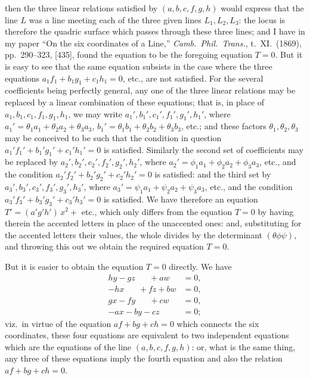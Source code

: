 \documentclass[11pt,a4paper]{article}
\begin{document}
\newpage


\noindent then the three linear relations satisfied by $(a, b, c, f, g, h)$ would express that the line $L$ was a line meeting each of the three given lines $L_{1}, L_{2}, L_{3}$: the locus is therefore the quadric surface which passes through these three lines; and I have in my paper ``On the six coordinates of a Line,'' \emph{Camb.\ Phil.\ Trans.}, t.~XI.\ (1869), pp.~290--323, [435], found the equation to be the foregoing equation $T = 0$. But it is easy to see that the same equation subsists in the case where the three equations $a_{1}f_{1} + b_{1}g_{1} + c_{1}h_{1} = 0$, etc., are not satisfied. For the several coefficients being perfectly general, any one of the three linear relations may be replaced by a linear combination of these equations; that is, in place of $a_{1}, b_{1}, c_{1}, f_{1}, g_{1}, h_{1}$, we may write $a_{1}', b_{1}', c_{1}', f_{1}', g_{1}', h_{1}'$, where $a_{1}' = \theta_{1}a_{1} + \theta_{2}a_{2} + \theta_{3}a_{3}$, $b_{1}' = \theta_{1}b_{1} + \theta_{2}b_{2} + \theta_{3}b_{3}$, etc.; and these factors $\theta_{1}, \theta_{2}, \theta_{3}$ may be conceived to be such that the condition in question $a_{1}'f_{1}' + b_{1}'g_{1}' + c_{1}'h_{1}' = 0$ is satisfied. Similarly the second set of coefficients may be replaced by $a_{2}', b_{2}', c_{2}', f_{2}', g_{2}', h_{2}'$, where $a_{2}' = \phi_{1}a_{1} + \phi_{2}a_{2} + \phi_{3}a_{3}$, etc., and the condition $a_{2}'f_{2}' + b_{2}'g_{2}' + c_{2}'h_{2}' = 0$ is satisfied: and the third set by $a_{3}', b_{3}', c_{3}', f_{3}', g_{3}', h_{3}'$, where $a_{3}' = \psi_{1}a_{1} + \psi_{2}a_{2} + \psi_{3}a_{3}$, etc., and the condition $a_{3}'f_{3}' + b_{3}'g_{3}' + c_{3}'h_{3}' = 0$ is satisfied. We have therefore an equation $T' = (a'g'h')\,x^{2} +$ etc., which only differs from the equation $T = 0$ by having therein the accented letters in place of the unaccented ones: and, substituting for the accented letters their values, the whole divides by the determinant $(\theta\phi\psi)$, and throwing this out we obtain the required equation $T = 0$.

\medskip

But it is easier to obtain the equation $T = 0$ directly. We have
\begin{align*}
hy - gz \;\;\;\;\;\; + aw &= 0,\\
-hx \;\;\;\;\;\; + fz + bw &= 0,\\
gx - fy \;\;\;\;\;\; + cw &= 0,\\
-ax - by - cz \;\;\;\;\;\; &= 0;
\end{align*}
viz.\ in virtue of the equation $af + bg + ch = 0$ which connects the six coordinates, these four equations are equivalent to two independent equations which are the equations of the line $(a, b, c, f, g, h)$: or, what is the same thing, any three of these equations imply the fourth equation and also the relation $af + bg + ch = 0$.
\end{document}
